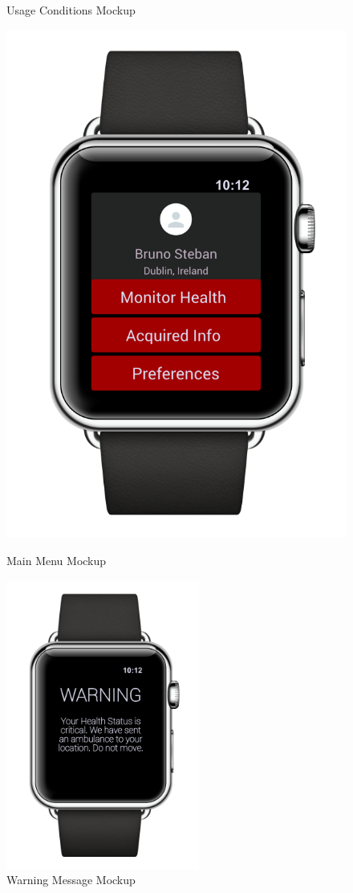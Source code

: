 \begin{enumerate}
\begin{figure}[H]
\begin{center}
\begin{minipage}[c]{.40\textwidth}
	\caption{Usage Conditions Mockup}
        \end{minipage}
      \end{center}
\end{figure}
\begin{figure}[H]
\begin{center}
        \begin{minipage}[c]{.35\textwidth}
	\centering
          \includegraphics[height=9.5  cm]{Images/Mockups/AutomatedSOSMockup5.png}
	\caption{Main Menu Mockup}
        \end{minipage}%
        \hspace{10mm}%
        \begin{minipage}[c]{.40\textwidth}
	\centering
          \includegraphics[height=9.5cm]{Images/Mockups/AutomatedSOSMockup7.png}
	\caption{Warning Message Mockup}
        \end{minipage}
      \end{center}
\end{figure}


\end{enumerate}
